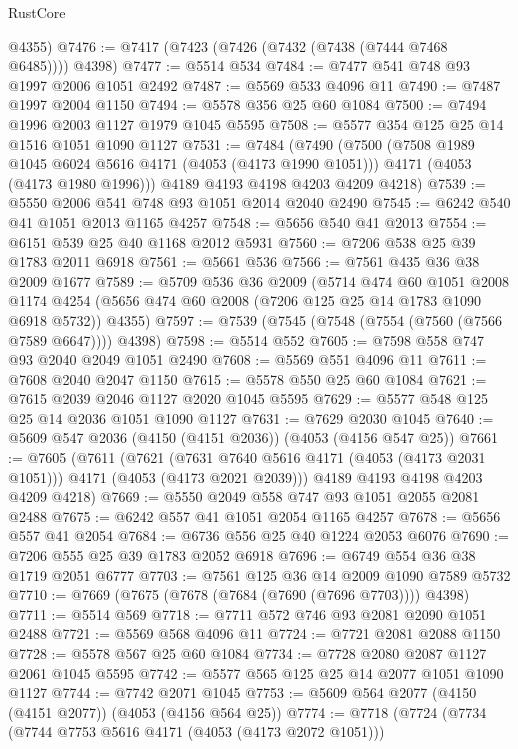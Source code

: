\begin{lexlean}{RustCore}
\begin{coremodule}
      @4355)
@7476 := @7417 (@7423 (@7426 (@7432 (@7438 (@7444 @7468 @6485)))) @4398)
@7477 := @5514 @534
@7484 := @7477 @541 @748 @93 @1997 @2006 @1051 @2492
@7487 := @5569 @533 @4096 @11
@7490 := @7487 @1997 @2004 @1150
@7494 := @5578 @356 @25 @60 @1084
@7500 := @7494 @1996 @2003 @1127 @1979 @1045 @5595
@7508 := @5577 @354 @125 @25 @14 @1516 @1051 @1090 @1127
@7531 := @7484
    (@7490
      (@7500
        (@7508 @1989 @1045 @6024 @5616 @4171 (@4053 (@4173 @1990 @1051)))
        @4171
        (@4053 (@4173 @1980 @1996)))
      @4189
      @4193
      @4198
      @4203
      @4209
      @4218)
@7539 := @5550 @2006 @541 @748 @93 @1051 @2014 @2040 @2490
@7545 := @6242 @540 @41 @1051 @2013 @1165 @4257
@7548 := @5656 @540 @41 @2013
@7554 := @6151 @539 @25 @40 @1168 @2012 @5931
@7560 := @7206 @538 @25 @39 @1783 @2011 @6918
@7561 := @5661 @536
@7566 := @7561 @435 @36 @38 @2009 @1677
@7589 := @5709
    @536
    @36
    @2009
    (@5714
      @474
      @60
      @1051
      @2008
      @1174
      @4254
      (@5656 @474 @60 @2008 (@7206 @125 @25 @14 @1783 @1090 @6918 @5732))
      @4355)
@7597 := @7539 (@7545 (@7548 (@7554 (@7560 (@7566 @7589 @6647)))) @4398)
@7598 := @5514 @552
@7605 := @7598 @558 @747 @93 @2040 @2049 @1051 @2490
@7608 := @5569 @551 @4096 @11
@7611 := @7608 @2040 @2047 @1150
@7615 := @5578 @550 @25 @60 @1084
@7621 := @7615 @2039 @2046 @1127 @2020 @1045 @5595
@7629 := @5577 @548 @125 @25 @14 @2036 @1051 @1090 @1127
@7631 := @7629 @2030 @1045
@7640 := @5609 @547 @2036 (@4150 (@4151 @2036)) (@4053 (@4156 @547 @25))
@7661 := @7605
    (@7611
      (@7621
        (@7631 @7640 @5616 @4171 (@4053 (@4173 @2031 @1051)))
        @4171
        (@4053 (@4173 @2021 @2039)))
      @4189
      @4193
      @4198
      @4203
      @4209
      @4218)
@7669 := @5550 @2049 @558 @747 @93 @1051 @2055 @2081 @2488
@7675 := @6242 @557 @41 @1051 @2054 @1165 @4257
@7678 := @5656 @557 @41 @2054
@7684 := @6736 @556 @25 @40 @1224 @2053 @6076
@7690 := @7206 @555 @25 @39 @1783 @2052 @6918
@7696 := @6749 @554 @36 @38 @1719 @2051 @6777
@7703 := @7561 @125 @36 @14 @2009 @1090 @7589 @5732
@7710 := @7669 (@7675 (@7678 (@7684 (@7690 (@7696 @7703)))) @4398)
@7711 := @5514 @569
@7718 := @7711 @572 @746 @93 @2081 @2090 @1051 @2488
@7721 := @5569 @568 @4096 @11
@7724 := @7721 @2081 @2088 @1150
@7728 := @5578 @567 @25 @60 @1084
@7734 := @7728 @2080 @2087 @1127 @2061 @1045 @5595
@7742 := @5577 @565 @125 @25 @14 @2077 @1051 @1090 @1127
@7744 := @7742 @2071 @1045
@7753 := @5609 @564 @2077 (@4150 (@4151 @2077)) (@4053 (@4156 @564 @25))
@7774 := @7718
    (@7724
      (@7734
        (@7744 @7753 @5616 @4171 (@4053 (@4173 @2072 @1051)))

\end{coremodule}
\end{lexlean}
